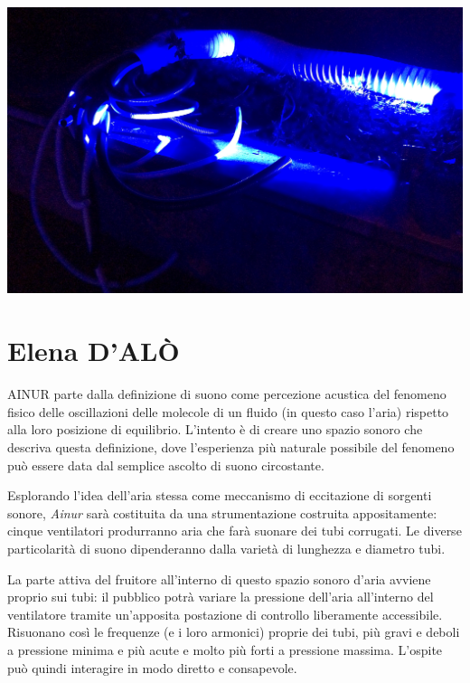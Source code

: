 \documentclass[
	a0,
	portrait
	]{a0poster}
\begin{document}
\begin{multicols}{4}

\begin{center}
\includegraphics[width=1.\linewidth]{IMG_2143}
\end{center}


\section*{\color{cyellow}Elena D'ALÒ}

\lettrine{AINUR}{} parte dalla definizione di suono come percezione acustica del fenomeno fisico delle oscillazioni delle molecole di un fluido (in questo caso l’aria) rispetto alla loro posizione di equilibrio. L’intento è di creare uno spazio sonoro che descriva questa definizione, dove l’esperienza più naturale possibile del fenomeno può essere data dal semplice ascolto di suono circostante.

Esplorando l’idea dell'aria stessa come meccanismo di eccitazione di sorgenti sonore, \emph{Ainur} sarà costituita da una strumentazione costruita appositamente: cinque ventilatori produrranno aria che farà suonare dei tubi corrugati. Le diverse particolarità di suono dipenderanno dalla varietà di lunghezza e diametro tubi. 

La parte attiva del fruitore all’interno di questo spazio sonoro d’aria avviene proprio sui tubi: il pubblico potrà variare la pressione dell’aria all’interno del ventilatore tramite un’apposita postazione di controllo liberamente accessibile. Risuonano così le frequenze (e i loro armonici) proprie dei tubi, più gravi e deboli a pressione minima e più acute e molto più forti a pressione massima. L’ospite può quindi interagire in modo diretto e consapevole. 


\end{multicols}
\end{document}
